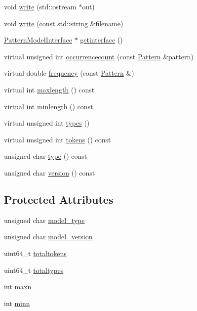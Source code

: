 \begin{DoxyCompactItemize}
\item 
void \hyperlink{classPatternSetModel_a8b5731f823fd868cfc6b219e01b13343}{write} (std\+::ostream $\ast$out)
\item 
void \hyperlink{classPatternSetModel_a9ad4bb51ec6c1272b4d73168e8267c2c}{write} (const std\+::string \&filename)
\item 
\hyperlink{classPatternModelInterface}{Pattern\+Model\+Interface} $\ast$ \hyperlink{classPatternSetModel_af2ead0d1766424cb00e95f76cab0c334}{getinterface} ()
\item 
virtual unsigned int \hyperlink{classPatternSetModel_ab1ca42eb82df349263b10c57f968678e}{occurrencecount} (const \hyperlink{classPattern}{Pattern} \&pattern)
\item 
virtual double \hyperlink{classPatternSetModel_af5bdb2a283c048233e62b2a0741b7cab}{frequency} (const \hyperlink{classPattern}{Pattern} \&)
\item 
virtual int \hyperlink{classPatternSetModel_abd386cc901e2328079a349eae42d9ee8}{maxlength} () const 
\item 
virtual int \hyperlink{classPatternSetModel_a3cc6ca22d4dd68270068d5a4e05f530a}{minlength} () const 
\item 
virtual unsigned int \hyperlink{classPatternSetModel_a178d3c988a43130b4ba3d4fa57001055}{types} ()
\item 
virtual unsigned int \hyperlink{classPatternSetModel_aa834dd6a5467ea8a68680512d6251e16}{tokens} () const 
\item 
unsigned char \hyperlink{classPatternSetModel_a5ca48d3e5c9d52b3eae858d033706bf6}{type} () const 
\item 
unsigned char \hyperlink{classPatternSetModel_a664147d04aad980c5cefbffca9bb4285}{version} () const 
\end{DoxyCompactItemize}
\subsection*{Protected Attributes}
\begin{DoxyCompactItemize}
\item 
unsigned char \hyperlink{classPatternSetModel_a932b792d6f1dc488c772efb6c8530b85}{model\+\_\+type}
\item 
unsigned char \hyperlink{classPatternSetModel_ad80b50a1066615f9b20e791dfee50296}{model\+\_\+version}
\item 
uint64\+\_\+t \hyperlink{classPatternSetModel_ae64f1edc5d72066d8cc6fbb80422518b}{totaltokens}
\item 
uint64\+\_\+t \hyperlink{classPatternSetModel_ac7aeed2a7d78ef5883ba38618a3e49a7}{totaltypes}
\item 
int \hyperlink{classPatternSetModel_aa1b03b92de5af1cf36545dfbff5b56f4}{maxn}
\item 
int \hyperlink{classPatternSetModel_a52940caa8c4bb3900f75ead2cb8a97c8}{minn}
\end{DoxyCompactItemize}



